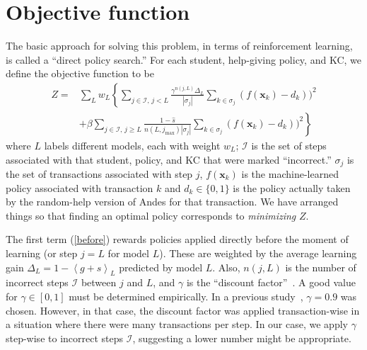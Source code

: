 \documentclass[11pt,letterpaper]{article}
\begin{document}
\section{Objective function}

The basic approach for solving this problem, in terms of reinforcement
learning, is called a ``direct policy search.''
For each student, help-giving policy, and KC, we define the objective 
function to be 
%
\begin{subequations}
  \label{objective}
  \begin{align}
  Z =& \sum_L w_L \left\{\sum_{j \in \mathcal{I},\,j<L}  
       \frac{\gamma^{n(j,L)} \Delta_L}{\left|\sigma_j\right|}
  \sum_{k\in \sigma_j} \left(f(\mathbf{x}_k)-d_k\right))^2 \right.
     \label{before} \\
  &+\beta \left. \sum_{j \in \mathcal{I},\,j \ge L} \frac{1-\hat{s}}
      {n(L,j_\mathrm{max})\left|\sigma_j\right|}
             \sum_{k\in \sigma_j} \left(f(\mathbf{x}_k)-d_k\right))^2
     \right\}
  \label{after}
  \end{align}
\end{subequations}
%
where $L$ labels different models, each with weight $w_L$;
$\mathcal{I}$ is the set of steps associated
with that student, policy, and KC that were marked ``incorrect.''  
$\sigma_j$ is the set of transactions associated with step $j$,
$f(\mathbf{x}_k)$ is the machine-learned policy associated
with transaction $k$ and
$d_k\in \{0,1\}$ is the
policy actually taken by the random-help version of Andes for that 
transaction.
We have arranged things so that finding an optimal policy 
corresponds to {\em minimizing} $Z$.

The first term (\ref{before}) rewards policies applied directly before
the moment of learning (or step $j=L$ for model $L$).  
These are weighted by the 
average learning gain $\Delta_L = 1-\left\langle g+s\right\rangle_L$ 
predicted by model $L$.
Also, $n(j,L)$ is the number
of incorrect steps $\mathcal{I}$ between $j$ and $L$, 
and $\gamma$ is the ``discount factor''~\cite{ml}. 
A good value for $\gamma \in [0,1]$ must be determined empirically.
In a previous study~\cite{mint}, $\gamma=0.9$ was chosen.
However, in that case, the discount factor was applied transaction-wise in 
a situation where there were many transactions per step.  In our case, 
we apply $\gamma$ step-wise to incorrect steps $\mathcal{I}$, 
suggesting a lower number might be appropriate.
\end{document}
